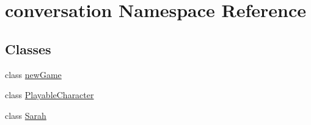 \hypertarget{namespaceconversation}{}\section{conversation Namespace Reference}
\label{namespaceconversation}
\subsection*{Classes}
\begin{DoxyCompactItemize}
\item 
class \hyperlink{classconversation_1_1newGame}{new\+Game}
\item 
class \hyperlink{classconversation_1_1PlayableCharacter}{Playable\+Character}
\item 
class \hyperlink{classconversation_1_1Sarah}{Sarah}
\end{DoxyCompactItemize}
